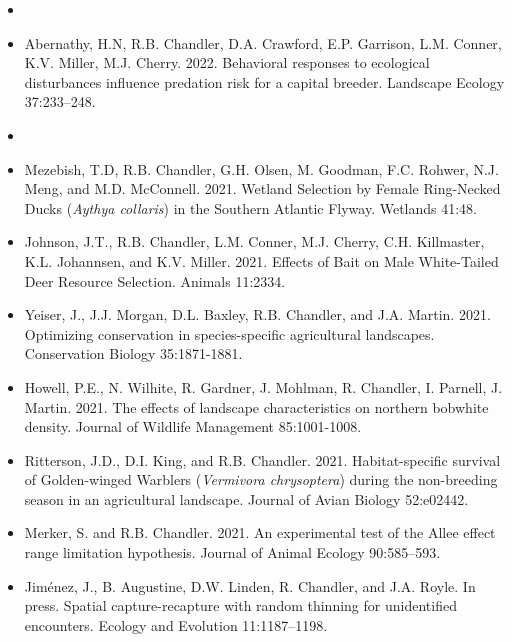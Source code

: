 \begin{itemize}
  
\item[] { \\}

\item Abernathy, H.N, R.B. Chandler, D.A. Crawford, E.P. Garrison,
  L.M. Conner, K.V. Miller, M.J. Cherry. 2022. Behavioral
  responses to ecological disturbances influence predation risk for a
  capital breeder. Landscape Ecology 37:233--248.

\item[] { \\}

\item Mezebish, T.D, R.B. Chandler, G.H. Olsen, M. Goodman,
  F.C. Rohwer, N.J. Meng, and M.D. McConnell. 2021. Wetland Selection
  by Female Ring-Necked Ducks ({\it Aythya collaris}) in the Southern
  Atlantic Flyway. Wetlands 41:48.

\item Johnson, J.T., R.B. Chandler, L.M. Conner, M.J. Cherry,
  C.H. Killmaster, K.L. Johannsen, and K.V. Miller. 2021. Effects of
  Bait on Male White-Tailed Deer Resource Selection. Animals 11:2334. 
  
\item Yeiser, J., J.J. Morgan, D.L. Baxley, R.B. Chandler, and
  J.A. Martin. 2021. Optimizing conservation in species-specific
  agricultural landscapes. Conservation Biology 35:1871-1881. 

\item Howell, P.E., N. Wilhite, R. Gardner, J. Mohlman, R. Chandler,
  I. Parnell, J. Martin. 2021. The effects of landscape
  characteristics on northern bobwhite density. Journal of Wildlife
  Management 85:1001-1008. 

\item Ritterson, J.D., D.I. King, and
  R.B. Chandler. 2021. Habitat-specific survival of Golden-winged
  Warblers ({\it Vermivora chrysoptera}) during the non-breeding
  season in an agricultural landscape. Journal of Avian Biology
  52:e02442.  
  
\item Merker, S. and R.B. Chandler. 2021. An experimental test of 
  the Allee effect range limitation hypothesis. Journal of Animal
  Ecology 90:585--593. 

\item Jim\'enez, J., B. Augustine, D.W. Linden, R. Chandler, and
  J.A. Royle. In press. Spatial capture-recapture with random thinning
  for unidentified encounters. Ecology and Evolution 11:1187--1198.


\end{itemize}
